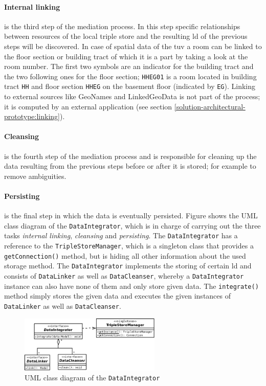 \documentclass[draft,final]{vutinfth} %
\begin{document}
\paragraph{Internal linking} is the third step of the mediation process. In this step specific relationships between resources of the local triple store and the resulting \gls{ld} of the previous steps will be discovered. In case of spatial data of the \gls{tuv} a room can be linked to the floor section or building tract of which it is a part by taking a look at the room number. The first two symbols are an indicator for the building tract and the two following ones for the floor section; \texttt{HHEG01} is a room located in building tract \texttt{HH} and floor section \texttt{HHEG} on the basement floor (indicated by \texttt{EG}). Linking to external sources like GeoNames and LinkedGeoData is not part of the process; it is computed by an external application (see section \ref{solution-architectural-prototype:linking}).  

\paragraph{Cleansing} is the fourth step of the mediation process and is responsible for cleaning up the data resulting from the previous steps before or after it is stored; for example to remove ambiguities.

\paragraph{Persisting} is the final step in which the data is eventually persisted. Figure shows the UML class diagram of the \texttt{DataIntegrator}, which is in charge of carrying out the three tasks \textit{internal linking}, \textit{cleansing} and \textit{persisting}. The \texttt{DataIntegrator} has a reference to the \texttt{TripleStoreManager}, which is a singleton class that provides a \texttt{getConnection()} method, but is hiding all other information about the used storage method. The \texttt{DataIntegrator} implements the storing of certain \gls{ld} and consists of \texttt{DataLinker} as well as \texttt{DataCleanser}, whereby a \texttt{DataIntegrator} instance can also have none of them and only store given data. The \texttt{integrate()} method simply stores the given data and executes the given instances of \texttt{DataLinker} as well as \texttt{DataCleanser}. 

\begin{figure}[h]
    \centering
    \includegraphics[width=0.6\textwidth]{graphics/solution/architecture/dataintegrator.png}
    \caption{UML class diagram of the \texttt{DataIntegrator}}
    \label{fig:solution-architectural-prototype:acquirer-uml-class-dia}
\end{figure}
\end{document}
